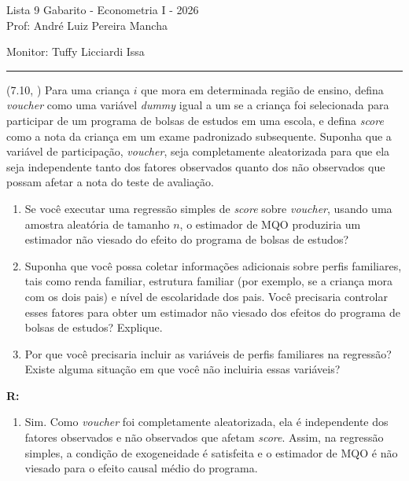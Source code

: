 \documentclass[12pt,letterpaper, onecolumn]{exam}
\renewenvironment{solution}
{\par\noindent\textbf{R:}\enspace\color{blue}}
{\par\color{black}}
\begin{document}
\begingroup
\centering
\LARGE Lista 9 Gabarito - Econometria I - 2026\\[0.5em]
\large Prof: André Luiz Pereira Mancha \par
\large Monitor: Tuffy Licciardi Issa \par
\endgroup
\rule{\textwidth}{0.4pt}
\pointsdroppedatright
\printanswers
\renewcommand{\solutiontitle}{\noindent\textbf{Ans:}\enspace}
\newcommand{\qstar}{\hspace{-0.6em}\textsuperscript{*}\hspace{0.2em}}

\begin{questions}

\question (7.10, \citep{wooldridge2016}) Para uma criança \(i\) que mora em determinada região de ensino, defina \textit{voucher} como uma variável \textit{dummy} igual a um se a criança foi selecionada para participar de um programa de bolsas de estudos em uma escola, e defina \textit{score} como a nota da criança em um exame padronizado subsequente. Suponha que a variável de participação, \textit{voucher}, seja completamente aleatorizada para que ela seja independente tanto dos fatores observados quanto dos não observados que possam afetar a nota do teste de avaliação.
\begin{enumerate}[label=(\roman*)]
    \item Se você executar uma regressão simples de \textit{score} sobre \textit{voucher}, usando uma amostra aleatória de tamanho \(n\), o estimador de MQO produziria um estimador não viesado do efeito do programa de bolsas de estudos?
    \item Suponha que você possa coletar informações adicionais sobre perfis familiares, tais como renda familiar, estrutura familiar (por exemplo, se a criança mora com os dois pais) e nível de escolaridade dos pais. Você precisaria controlar esses fatores para obter um estimador não viesado dos efeitos do programa de bolsas de estudos? Explique.
    \item Por que você precisaria incluir as variáveis de perfis familiares na regressão? Existe alguma situação em que você não incluiria essas variáveis?
\end{enumerate}

\begin{solution}
\begin{enumerate}[label=(\roman*)]
    \item Sim. Como \textit{voucher} foi completamente aleatorizada, ela é independente dos fatores observados e não observados que afetam \textit{score}. Assim, na regressão simples, a condição de exogeneidade é satisfeita e o estimador de MQO é não viesado para o efeito causal médio do programa.


\end{enumerate}
\end{solution}
\end{questions}
\end{document}

